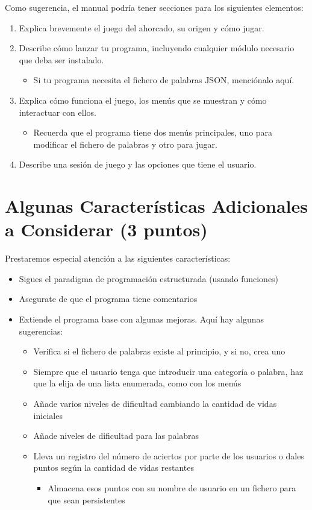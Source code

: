 \documentclass[10pt,a4paper]{article}
\begin{document}
Como sugerencia, el manual podría tener secciones para los siguientes elementos:

\begin{enumerate}
\item Explica brevemente el juego del ahorcado, su origen y cómo jugar.
\item Describe cómo lanzar tu programa, incluyendo cualquier módulo necesario que deba ser instalado.
    \begin{itemize}
    \item Si tu programa necesita el fichero de palabras JSON, menciónalo aquí.
    \end{itemize}
\item Explica cómo funciona el juego, los menús que se muestran y cómo interactuar con ellos.
    \begin{itemize}
    \item Recuerda que el programa tiene dos menús principales, uno para modificar el fichero de palabras y otro para jugar.
    \end{itemize}
\item Describe una sesión de juego y las opciones que tiene el usuario.
\end{enumerate}

\section{Algunas Características Adicionales a Considerar (3 puntos)}

Prestaremos especial atención a las siguientes características:

\begin{itemize}
\item Sigues el paradigma de programación estructurada (usando funciones)
\item Asegurate de que el programa tiene comentarios
\item Extiende el programa base con algunas mejoras. Aquí hay algunas sugerencias:
    \begin{itemize}
    \item Verifica si el fichero de palabras existe al principio, y si no, crea uno
    \item Siempre que el usuario tenga que introducir una categoría o palabra, haz que la elija de una lista enumerada, como con los menús
    \item Añade varios niveles de dificultad cambiando la cantidad de vidas iniciales
    \item Añade niveles de dificultad para las palabras
    \item Lleva un registro del número de aciertos por parte de los usuarios o dales puntos según la cantidad de vidas restantes
        \begin{itemize}
        \item Almacena esos puntos con su nombre de usuario en un fichero para que sean persistentes
        \end{itemize}
    \end{itemize}
\end{itemize}
\end{document}
